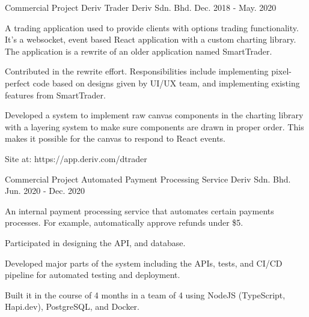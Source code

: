 

\begin{cventries}

  \cventry
    {Commercial Project} %
    {Deriv Trader} %
    {Deriv Sdn. Bhd.} %
    {Dec. 2018 - May. 2020} %
    {
      \begin{cvitems} %
        \item {A trading application used to provide clients with options trading functionality. It's a websocket, event based React application with a custom charting library. The application is a rewrite of an older application named SmartTrader.}
        \item {Contributed in the rewrite effort. Responsibilities include implementing pixel-perfect code based on designs given by UI/UX team, and implementing existing features from SmartTrader.}
        \item {Developed a system to implement raw canvas components in the charting library with a layering system to make sure components are drawn in proper order. This makes it possible for the canvas to respond to React events.}
        \item {Site at: https://app.deriv.com/dtrader}
      \end{cvitems}
    }

  \cventry
    {Commercial Project} %
    {Automated Payment Processing Service} %
    {Deriv Sdn. Bhd.} %
    {Jun. 2020 - Dec. 2020} %
    {
      \begin{cvitems} %
        \item {An internal payment processing service that automates certain payments processes. For example, automatically approve refunds under \$5.}
        \item {Participated in designing the API, and database.}
        \item {Developed major parts of the system including the APIs, tests, and CI/CD pipeline for automated testing and deployment.}
        \item {Built it in the course of 4 months in a team of 4 using NodeJS (TypeScript, Hapi.dev), PostgreSQL, and Docker.}
      \end{cvitems}
    }


\end{cventries}
